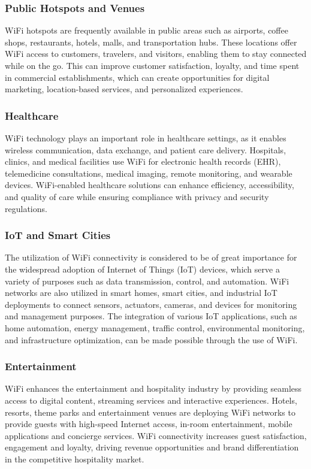\subsubsection{Public Hotspots and Venues}
WiFi hotspots are frequently available in public areas such as airports, coffee shops, restaurants, hotels, malls, and transportation hubs. These locations offer WiFi access to customers, travelers, and visitors, enabling them to stay connected while on the go. This can improve customer satisfaction, loyalty, and time spent in commercial establishments, which can create opportunities for digital marketing, location-based services, and personalized experiences.

\subsubsection{Healthcare}
WiFi technology plays an important role in healthcare settings, as it enables wireless communication, data exchange, and patient care delivery. Hospitals, clinics, and medical facilities use WiFi for electronic health records (EHR), telemedicine consultations, medical imaging, remote monitoring, and wearable devices. WiFi-enabled healthcare solutions can enhance efficiency, accessibility, and quality of care while ensuring compliance with privacy and security regulations.

\subsubsection{IoT and Smart Cities}
The utilization of WiFi connectivity is considered to be of great importance for the widespread adoption of Internet of Things (IoT) devices, which serve a variety of purposes such as data transmission, control, and automation. WiFi networks are also utilized in smart homes, smart cities, and industrial IoT deployments to connect sensors, actuators, cameras, and devices for monitoring and management purposes. The integration of various IoT applications, such as home automation, energy management, traffic control, environmental monitoring, and infrastructure optimization, can be made possible through the use of WiFi.

\subsubsection{Entertainment}
WiFi enhances the entertainment and hospitality industry by providing seamless access to digital content, streaming services and interactive experiences. Hotels, resorts, theme parks and entertainment venues are deploying WiFi networks to provide guests with high-speed Internet access, in-room entertainment, mobile applications and concierge services. WiFi connectivity increases guest satisfaction, engagement and loyalty, driving revenue opportunities and brand differentiation in the competitive hospitality market.

